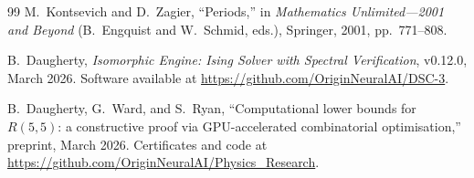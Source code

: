 \documentclass[11pt,a4paper]{article}
\theoremstyle{plain}
\theoremstyle{remark}
\begin{document}
\begin{thebibliography}{99}
M.~Kontsevich and D.~Zagier,
``Periods,''
in \emph{Mathematics Unlimited---2001 and Beyond}
(B.~Engquist and W.~Schmid, eds.),
Springer, 2001, pp.~771--808.

B.~Daugherty,
\emph{Isomorphic Engine: Ising Solver with Spectral Verification},
v0.12.0, March 2026.
Software available at
\url{https://github.com/OriginNeuralAI/DSC-3}.

B.~Daugherty, G.~Ward, and S.~Ryan,
``Computational lower bounds for $R(5,5)$: a constructive proof via
GPU-accelerated combinatorial optimisation,''
preprint, March 2026.
Certificates and code at
\url{https://github.com/OriginNeuralAI/Physics_Research}.

\end{thebibliography}
\end{document}
